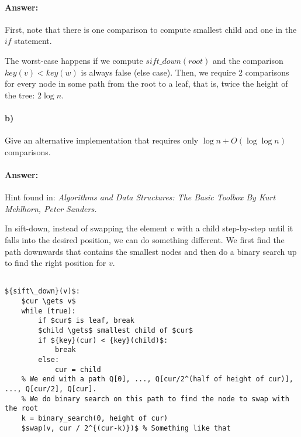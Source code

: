 \documentclass[a4paper]{article}
\begin{document}
\paragraph{Answer:} First, note that there is one comparison to compute smallest child and one in the ${if}$ statement.
 
The worst-case happens if we compute ${sift\_down}({root})$ and the comparison ${key}(v) < {key}(w)$ is always false (else case). Then, we require 2 comparisons for every node in some path from the root to a leaf, that is, twice the height of the tree:  $2 \log n$.

\paragraph{b) } Give an alternative implementation that requires only $\log n + O(\log \log n)$ comparisons.

\paragraph{Answer:}

Hint found in: \emph{Algorithms and Data Structures: The Basic Toolbox By Kurt Mehlhorn, Peter Sanders.}

In sift-down, instead of swapping the element $v$ with a child step-by-step until it falls into the desired position, we can do something different. We first find the path downwards that contains the smallest nodes and then do a binary search up to find the right position for $v$.

\begin{lstlisting}[mathescape]

${sift\_down}(v)$:
    $cur \gets v$
    while (true):
        if $cur$ is leaf, break
        $child \gets$ smallest child of $cur$
        if ${key}(cur) < {key}(child)$:
            break
        else:
            cur = child
    % We end with a path Q[0], ..., Q[cur/2^(half of height of cur)], ..., Q[cur/2], Q[cur].
    % We do binary search on this path to find the node to swap with the root
    k = binary_search(0, height of cur)
    $swap(v, cur / 2^{(cur-k)})$ % Something like that
    
    
\end{lstlisting}
\end{document}
